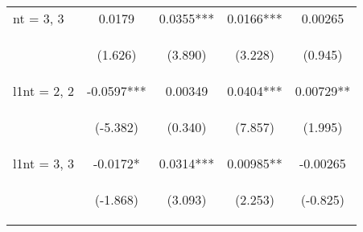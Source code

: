 \documentclass[]{standalone}
\begin{document}
\begin{tabular}{lcccc}
    nt = 3, 3        & 0.0179                                         & 0.0355***                                      & 0.0166***                                      & 0.00265                                        \\
    \vspace{4pt}     & \begin{footnotesize}(1.626)\end{footnotesize}  & \begin{footnotesize}(3.890)\end{footnotesize}  & \begin{footnotesize}(3.228)\end{footnotesize}  & \begin{footnotesize}(0.945)\end{footnotesize}  \\
    l1nt = 2, 2      & -0.0597***                                     & 0.00349                                        & 0.0404***                                      & 0.00729**                                      \\
    \vspace{4pt}     & \begin{footnotesize}(-5.382)\end{footnotesize} & \begin{footnotesize}(0.340)\end{footnotesize}  & \begin{footnotesize}(7.857)\end{footnotesize}  & \begin{footnotesize}(1.995)\end{footnotesize}  \\
    l1nt = 3, 3      & -0.0172*                                       & 0.0314***                                      & 0.00985**                                      & -0.00265                                       \\
    \vspace{4pt}     & \begin{footnotesize}(-1.868)\end{footnotesize} & \begin{footnotesize}(3.093)\end{footnotesize}  & \begin{footnotesize}(2.253)\end{footnotesize}  & \begin{footnotesize}(-0.825)\end{footnotesize} \\

\end{tabular}
\end{document}
